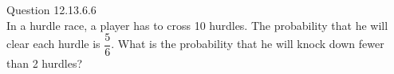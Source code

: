 \documentclass[11pt]{book}
\begin{document}
Question 12.13.6.6\\
In a hurdle race, a player has to cross 10 hurdles. The probability that he will clear each hurdle is $\dfrac{5}{6}$. What is the probability that he will knock down fewer than 2 hurdles?
\end{document}
